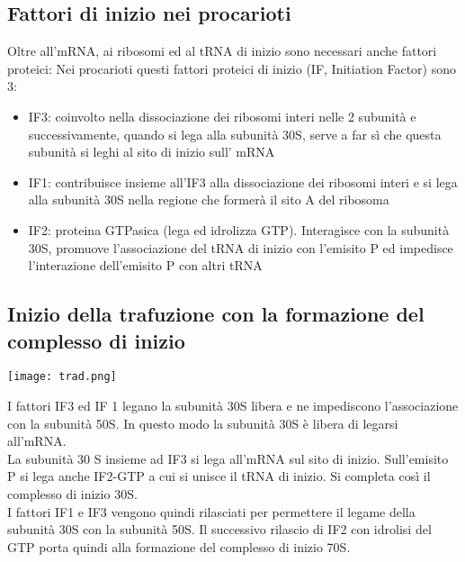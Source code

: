 \documentclass{article}
\begin{document}
\subsection{Fattori di inizio nei procarioti}
Oltre all'mRNA, ai ribosomi ed al tRNA di inizio sono necessari anche fattori proteici:
Nei procarioti questi fattori proteici di inizio (IF, Initiation Factor) sono 3:
\begin{itemize}
    \item IF3: coinvolto nella dissociazione dei ribosomi interi nelle 2 subunità e
    successivamente, quando si lega alla subunità 30S, serve a far sì che questa subunità
    si leghi al sito di inizio sull' mRNA
    \item IF1: contribuisce insieme all'IF3 alla dissociazione dei ribosomi interi e si lega alla
    subunità 30S nella regione che formerà il sito A del ribosoma
    \item IF2: proteina GTPasica (lega ed idrolizza GTP). Interagisce con la subunità 30S,
    promuove l'associazione del tRNA di inizio con l'emisito P ed impedisce l'interazione
    dell'emisito P con altri tRNA
\end{itemize}
\subsection{Inizio della trafuzione con la formazione del complesso di inizio}
\begin{center}
    \texttt{[image: trad.png]}
\end{center}
I fattori IF3 ed IF 1 legano la subunità 30S libera e ne impediscono l'associazione con la
subunità 50S. In questo modo la subunità 30S è libera di legarsi all'mRNA.\\
La subunità 30 S insieme ad IF3 si lega all'mRNA sul sito di inizio. Sull'emisito P si lega anche IF2-GTP a cui si unisce il tRNA di inizio. Si completa così il complesso di inizio 30S.\\
I fattori IF1 e IF3 vengono quindi rilasciati per permettere il legame della subunità 30S con la subunità 50S. Il successivo rilascio di IF2 con idrolisi del GTP porta quindi alla formazione del complesso di inizio 70S.
\end{document}
